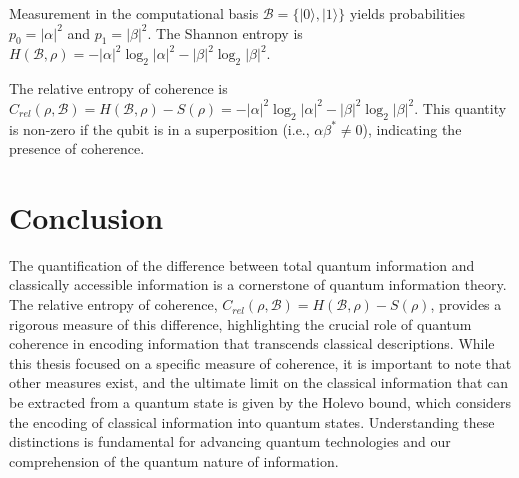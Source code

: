 \documentclass{article}
\theoremstyle{definition}
\begin{document}
	Measurement in the computational basis $\mathcal{B} = \{|0\rangle, |1\rangle\}$ yields probabilities $p_0 = |\alpha|^2$ and $p_1 = |\beta|^2$. The Shannon entropy is $H(\mathcal{B}, \rho) = -|\alpha|^2 \log_2 |\alpha|^2 - |\beta|^2 \log_2 |\beta|^2$.
	
	The relative entropy of coherence is $C_{rel}(\rho, \mathcal{B}) = H(\mathcal{B}, \rho) - S(\rho) = -|\alpha|^2 \log_2 |\alpha|^2 - |\beta|^2 \log_2 |\beta|^2$. This quantity is non-zero if the qubit is in a superposition (i.e., $\alpha \beta^* \neq 0$), indicating the presence of coherence.
	
	\section{Conclusion}
	
	The quantification of the difference between total quantum information and classically accessible information is a cornerstone of quantum information theory. The relative entropy of coherence, $C_{rel}(\rho, \mathcal{B}) = H(\mathcal{B}, \rho) - S(\rho)$, provides a rigorous measure of this difference, highlighting the crucial role of quantum coherence in encoding information that transcends classical descriptions. While this thesis focused on a specific measure of coherence, it is important to note that other measures exist, and the ultimate limit on the classical information that can be extracted from a quantum state is given by the Holevo bound, which considers the encoding of classical information into quantum states. Understanding these distinctions is fundamental for advancing quantum technologies and our comprehension of the quantum nature of information.
	
\end{document}
